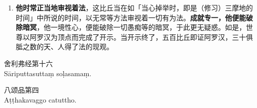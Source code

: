\begin{enumerate}\item \textbf{他时常正当地审视着法}，这比丘当在如「当心掉举时，即是（修习）三摩地的时间」中所说的时间，以无常等方法审视着一切有为法。\textbf{成就专一，他便能破除暗冥}，他一境性心，便能破除一切愚痴等的暗冥，于此更无疑惑。如是，世尊以阿罗汉为顶点而完成了开示。当开示终了，五百比丘即证阿罗汉，三十俱胝之数的天、人得了法的现观。\end{enumerate}

\begin{center}\vspace{1em}舍利弗经第十六\\Sāriputtasuttaṃ soḷasamaṃ.\end{center}

\begin{center}\vspace{1em}八颂品第四\\Aṭṭhakavaggo catuttho.\end{center}
